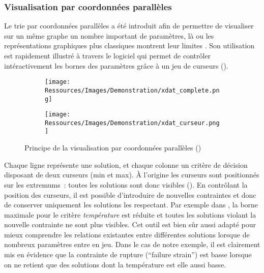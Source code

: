\subsubsection{Visualisation par coordonnées parallèles} %
\label{ssub:visualisation_par_coordonnees_paralleles}
Le trie par coordonnées parallèles a été introduit afin de permettre de visualiser
sur un même graphe un nombre important de paramètres, là ou les représentations
graphiques plus classiques montrent leur limites \parencite{Inselberg198725}.
Son utilisation est rapidement illustré à travers le logiciel 
qui permet de contrôler intéractivement les bornes des paramètres grâce à un jeu de
curseurs ().

\begin{figure}
    \centering
    \begin{subfigure}[b]{0.48\textwidth}
        \centering
        \texttt{[image: Ressources/Images/Demonstration/xdat\_complete.png]}
        \caption{}
        \label{fig:xdat_complete}
    \end{subfigure}
    \quad
    \begin{subfigure}[b]{0.48\textwidth}
        \centering
        \texttt{[image: Ressources/Images/Demonstration/xdat\_curseur.png]}
        \caption{}
        \label{fig:xdat_curseur}
    \end{subfigure}
    \caption[Principe de la visualisation par coordonnées parallèles.]
            {Principe de la visualisation par coordonnées parallèles
             ()}
    \label{fig:principe_xdat}
\end{figure}

Chaque ligne représente une solution, et chaque colonne un critère de décision disposant de
deux curseurs (min et max). À l’origine les curseurs sont positionnés sur les extremums~:
toutes les solutions sont donc visibles (). En contrôlant la
position des curseurs, il est possible d’introduire de nouvelles contraintes et donc
de conserver uniquement les solutions les respectant. Par exemple dans ,
la borne maximale pour le critère \emph{température} est réduite et toutes les solutions
violant la nouvelle contrainte ne sont plus visibles. Cet outil est bien sûr aussi adapté
pour mieux comprendre les relations existantes entre différentes solutions lorsque de
nombreux paramètres entre en jeu. Dans le cas de notre exemple, il est clairement mis en
évidence que la contrainte de rupture (\enquote{failure strain}) est basse lorsque on ne
retient que des solutions dont la température est elle aussi basse.


